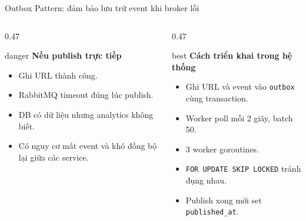 \documentclass[aspectratio=169]{beamer}
\begin{document}
\begin{frame}{Outbox Pattern: đảm bảo lưu trữ event khi broker lỗi}
    \begin{columns}[T,onlytextwidth]
        \begin{column}{0.47\textwidth}
            \begin{claimbox}{danger}
                \textbf{Nếu publish trực tiếp}
                \begin{itemize}\small
                    \item Ghi URL thành công.
                    \item RabbitMQ timeout đúng lúc publish.
                    \item DB có dữ liệu nhưng analytics không biết.
                    \item Có nguy cơ mất event và khó đồng bộ lại giữa các service.
                \end{itemize}
            \end{claimbox}
        \end{column}
        \begin{column}{0.47\textwidth}
            \begin{claimbox}{best}
                \textbf{Cách triển khai trong hệ thống}
                \begin{itemize}\small
                    \item Ghi URL và event vào \texttt{outbox} cùng transaction.
                    \item Worker poll mỗi 2 giây, batch 50.
                    \item 3 worker goroutines.
                    \item \texttt{FOR UPDATE SKIP LOCKED} tránh đụng nhau.
                    \item Publish xong mới set \texttt{published\_at}.
                \end{itemize}
            \end{claimbox}
        \end{column}
    \end{columns}
\end{frame}
\end{document}
